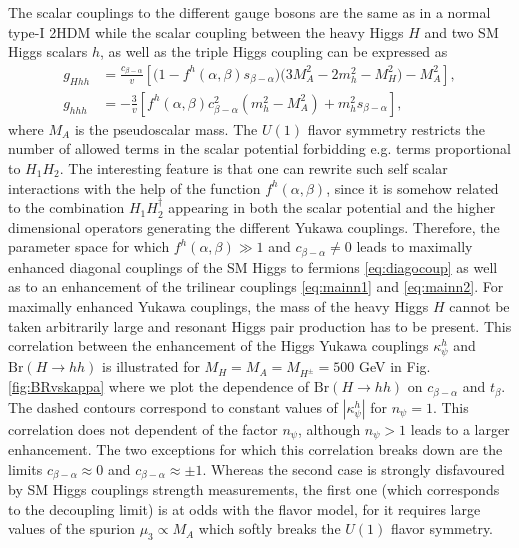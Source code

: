 The scalar couplings to the different gauge bosons are the same as in a normal type-I 2HDM while the scalar coupling between the heavy Higgs $H$ and two SM Higgs scalars $h$, as well as the triple Higgs coupling can be expressed as \cite{Boudjema:2001ii, Gunion:2002zf}
\begin{align}
\label{eq:mainn1}
g_{Hhh}&=\frac{c_{\beta-\alpha}}{v}\!\left[\big(1\!-\!f^h(\alpha,\beta)s_{\beta-\alpha}\big)\big(3M_A^2\!-\!2m_h^2\!-\!M_H^2\big)\!-\!M_A^2\right],\\
g_{hhh}&= -\frac{3}{v}\!\left[f^h(\alpha,\beta)c_{\beta-\alpha}^2(m_h^2-M_A^2)+m_h^2s_{\beta-\alpha}\right],\label{eq:mainn2}
\end{align}
where $M_A$ is the pseudoscalar mass. The $U(1)$ flavor symmetry restricts the number of allowed terms in the scalar potential forbidding e.g. terms proportional to $H_1 H_2$. The interesting feature is that one can rewrite such self scalar interactions with the help of the function $f^h(\alpha,\beta)$, since it is somehow related to the combination $H_1 H_2^{\dagger}$ appearing in both the scalar potential and the higher dimensional operators generating the different Yukawa couplings. Therefore, the parameter space for which $f^h(\alpha,\beta)\gg 1$ and  $c_{\beta-\alpha}\neq 0$ leads to maximally enhanced diagonal couplings of the SM Higgs to fermions \eqref{eq:diagocoup} as well as to an enhancement of the trilinear couplings \eqref{eq:mainn1} and \eqref{eq:mainn2}. For maximally enhanced Yukawa couplings, the mass of the heavy Higgs $H$ cannot be taken arbitrarily large and resonant Higgs pair production has to be present. This correlation between the enhancement of the Higgs Yukawa couplings $\kappa^h_{\psi}$ and $\text{Br}(H \to hh)$ is illustrated for $M_H=M_A=M_{H^\pm}=500$ GeV in Fig. \ref{fig:BRvskappa} where we plot the dependence of $\text{Br}(H \to hh)$ on $c_{\beta-\alpha} $ and $ t_\beta$.  The dashed contours correspond to constant values of $|\kappa_{\psi}^h|$ for $n_{\psi}=1$. This correlation does not dependent of the factor $n_\psi$, although  $n_\psi > 1$ leads to a larger enhancement. The two exceptions for which this correlation breaks down are the limits $c_{\beta-\alpha}\approx 0$ and $c_{\beta-\alpha}\approx \pm 1$. Whereas the second case is strongly disfavoured by SM Higgs couplings strength measurements, the first one (which corresponds to the decoupling limit) is at odds with the flavor model, for it requires large values of the spurion $\mu_3\propto M_A$ which softly breaks the $U(1)$ flavor symmetry. 




